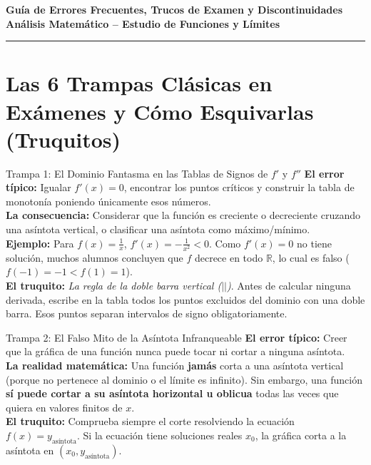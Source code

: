 \documentclass[10pt,a4paper]{article}
\begin{document}
\begin{center}
    {\LARGE \textbf{\color{mainblue} Guía de Errores Frecuentes, Trucos de Examen y Discontinuidades}}\\[2.5mm]
    {\large \textbf{Análisis Matemático -- Estudio de Funciones y Límites}}
\end{center}

\vspace{2mm}
\hrule
\vspace{4mm}

\section{Las 6 Trampas Clásicas en Exámenes y Cómo Esquivarlas (Truquitos)}

\begin{trampa}{Trampa 1: El Dominio Fantasma en las Tablas de Signos de $f'$ y $f''$}
\textbf{El error típico:} Igualar $f'(x) = 0$, encontrar los puntos críticos y construir la tabla de monotonía poniendo únicamente esos números.\\
\textbf{La consecuencia:} Considerar que la función es creciente o decreciente cruzando una asíntota vertical, o clasificar una asíntota como máximo/mínimo.\\
\textbf{Ejemplo:} Para $f(x) = \frac{1}{x}$, $f'(x) = -\frac{1}{x^2} < 0$. Como $f'(x) = 0$ no tiene solución, muchos alumnos concluyen que $f$ decrece en todo $\mathbb{R}$, lo cual es falso ($f(-1) = -1 < f(1) = 1$).\\
\textbf{El truquito:} \textit{La regla de la doble barra vertical ($||$)}. Antes de calcular ninguna derivada, escribe en la tabla todos los puntos excluidos del dominio con una doble barra. Esos puntos separan intervalos de signo obligatoriamente.
\end{trampa}

\vspace{3mm}

\begin{trampa}{Trampa 2: El Falso Mito de la Asíntota Infranqueable}
\textbf{El error típico:} Creer que la gráfica de una función nunca puede tocar ni cortar a ninguna asíntota.\\
\textbf{La realidad matemática:} Una función \textbf{jamás} corta a una asíntota vertical (porque no pertenece al dominio o el límite es infinito). Sin embargo, una función \textbf{sí puede cortar a su asíntota horizontal u oblicua} todas las veces que quiera en valores finitos de $x$.\\
\textbf{El truquito:} Comprueba siempre el corte resolviendo la ecuación $f(x) = y_{\text{asíntota}}$. Si la ecuación tiene soluciones reales $x_0$, la gráfica corta a la asíntota en $(x_0, y_{\text{asíntota}})$.
\end{trampa}
\end{document}
